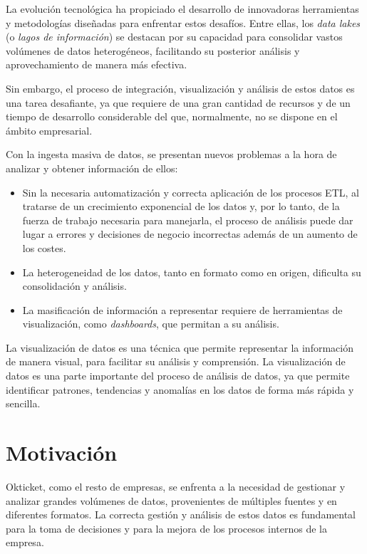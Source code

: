 La evolución tecnológica ha propiciado el desarrollo de innovadoras herramientas y metodologías
diseñadas para enfrentar estos desafíos. Entre ellas, los \textit{data lakes} (o \emph{lagos de
información}) se destacan por su capacidad para consolidar vastos volúmenes de datos heterogéneos,
facilitando su posterior análisis y aprovechamiento de manera más efectiva.

Sin embargo, el proceso de integración, visualización y análisis de estos datos es una tarea desafiante,
ya que requiere de una gran cantidad de recursos y de un tiempo de desarrollo considerable del que,
normalmente, no se dispone en el ámbito empresarial.

Con la ingesta masiva de datos, se presentan nuevos problemas a la hora de analizar y obtener
información de ellos:

\begin{itemize}
	\item Sin la necesaria automatización y correcta aplicación de los procesos ETL,
		al tratarse de un crecimiento exponencial de los datos y, por lo tanto, de la fuerza
		de trabajo necesaria para manejarla, el proceso de análisis puede dar lugar a errores
		y decisiones de negocio incorrectas además de un aumento de los costes.
	\item La heterogeneidad de los datos, tanto en formato como en origen, dificulta su
		consolidación y análisis.
	\item La masificación de información a representar requiere de herramientas de visualización,
		como \textit{dashboards}, que permitan a su análisis.
\end{itemize}

La visualización de datos es una técnica que permite representar la información de manera visual,
para facilitar su análisis y comprensión. La visualización de datos es una parte importante del
proceso de análisis de datos, ya que permite identificar patrones, tendencias y anomalías en los
datos de forma más rápida y sencilla.


\newpage{}
\section{Motivación}\label{sec:motivacion}
Okticket, como el resto de empresas, se enfrenta a la necesidad de gestionar y analizar grandes
volúmenes de datos, provenientes de múltiples fuentes y en diferentes formatos. La correcta gestión
y análisis de estos datos es fundamental para la toma de decisiones y para la mejora de los procesos
internos de la empresa.

